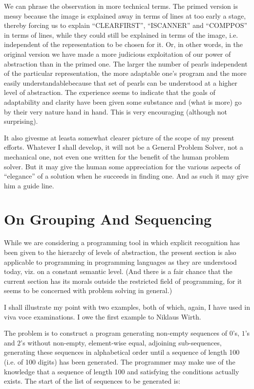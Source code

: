 We can phrase the observation in more technical terms. The primed version is messy because the image is explained away in terms of lines at too early a stage, thereby forcing us to explain ``CLEARFIRST'', ``ISCANNER'' and ``COMPPOS'' in terms of lines, while they could still be explained in terms of the image, i.e. independent of the representation to be chosen for it. Or, in other words, in the original version we have made a more judicious exploitation of our power of abstraction than in the primed one. The larger the number of pearls independent of the particular representation, the more adaptable one's program and the more easily understandable\textemdash{}because that set of pearls can be understood at a higher level of abstraction. The experience seems to indicate that the goals of adaptability and clarity have been given some substance and (what is more) go by their very nature hand in hand. This is very encouraging (although not surprising).

It also gives\textemdash{}me at least\textemdash{}a somewhat clearer picture of the scope of my present efforts. Whatever I shall develop, it will not be a General Problem Solver, not a mechanical one, not even one written for the benefit of the human problem solver. But it may give the human some appreciation for the various aspects of ``elegance'' of a solution when he succeeds in finding one. And as such it may give him a guide line.

\section[On grouping and sequencing]{On Grouping And Sequencing}
\label{sec:grouping-and-sequencing}

While we are considering a programming tool in which explicit recognition has been given to the hierarchy of levels of abstraction, the present section is also applicable to programming in programming languages as they are understood today, viz. on a constant semantic level. (And there is a fair chance that the current section has its morals outside the restricted field of programming, for it seems to be concerned with problem solving in general.)

I shall illustrate my point with two examples, both of which, again, I have used in viva voce examinations. I owe the first example to Niklaus Wirth.

The problem is to construct a program generating non-empty sequences of $0$'s, $1$'s and $2$'s without non-empty, element-wise equal, adjoining sub-sequences, generating these sequences in alphabetical order until a sequence of length 100 (i.e. of 100 digits) has been generated. The programmer may make use of the knowledge that a sequence of length 100 and satisfying the conditions actually exists. The start of the list of sequences to be generated is:

